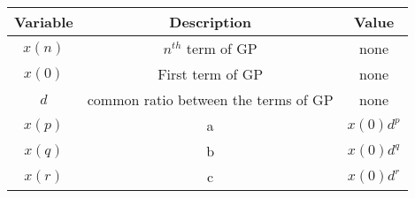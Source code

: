 \begin{tabular}{|c|c|c|} 
      \hline
\textbf{Variable}& \textbf{Description}& \textbf{Value}\\\hline
         $x(n)$& $n^{th}$ term of GP&none\\\hline
         $x(0)$& First term of GP&none\\\hline
          $d$&common ratio between the terms of GP&none\\\hline
          $x(p)$& a &$x(0)d^p$ \\ \hline
          $x(q)$& b &$x(0)d^q$ \\ \hline
          $x(r)$& c &$x(0)d^r$ \\ \hline
    \end{tabular}
